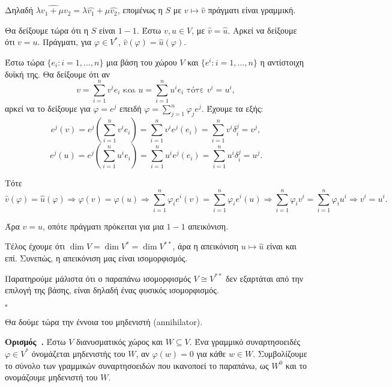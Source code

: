\documentclass[12pt, a4paper]{book}
\newcounter{definition}[section]
\newenvironment{definition}[1][]{\refstepcounter{definition}\par\medskip
   \textbf{Ορισμός~\thedefinition. #1} \rmfamily}{\medskip}
\begin{document}
Δηλαδή $\widehat{λv_1+μv_2} = λ\widehat{v_1} + μ\widehat{v_2}$, επομένως η $S$ με $v \mapsto \widehat{v}$ πράγματι είναι γραμμική.

Θα δείξουμε τώρα ότι η $S$ είναι $1-1$. Έστω $v, u \in V$, με $\widehat{v} = \widehat{u}$. Aρκεί να δείξουμε ότι $v = u$. Πράγματι, για $φ \in V^*$, $\widehat{v}(φ) = \widehat{u}(φ)$. 

Έστω τώρα $\{e_i: i=1,…,n\}$ μια βάση του χώρου $V$ και $\{e^i:i=1,…,n \}$ η αντίστοιχη δυϊκή της. Θα δείξουμε ότι αν
\begin{displaymath}
v = \sum_{i=1}^nv^ie_i \text{ και } u=\sum_{i=1}^nu^ie_i \text{ τότε } v^i = u^i,
\end{displaymath}
αρκεί να το δείξουμε για $φ = e^j$ επειδή $φ = \sum_{j=1}^nφ_ je^j$. Έχουμε τα εξής:
\begin{displaymath}
e^j(v) = e^j(\sum_{i=1}^nv^ie_i)= \sum_{i=1}^nv^ie^j(e_i)= \sum_{i=1}^nv^iδ_i^j = v^j,
\end{displaymath}
\begin{displaymath}
e^j(u) = e^j(\sum_{i=1}^nu^ie_i)= \sum_{i=1}^nu^ie^j(e_i)= \sum_{i=1}^nu^iδ_i^j = u^j.
\end{displaymath}

Τότε
\begin{displaymath}
\widehat{v}(φ) = \widehat{u}(φ) \Rightarrow φ(v) = φ(u) \Rightarrow \sum_{i=1}^nφ_ ie^i(v) = \sum_{i=1}^nφ_ ie^i(u) \Rightarrow \sum_{i=1}^nφ_ iv^i =\sum_{i=1}^nφ_ iu^i \Rightarrow v^i = u^i.
\end{displaymath}

Άρα $v = u$, οπότε πράγματι πρόκειται για μια $1-1$ απεικόνιση.

Τέλος έχουμε ότι $\dim{V} = \dim{V^*} = \dim{V^{**}}$, άρα η απεικόνιση $u \mapsto \widehat{u}$ είναι και επί. Συνεπώς, η απεικόνιση μας είναι ισομορφισμός.

Παρατηρούμε μάλιστα ότι ο παραπάνω ισομορφισμός $V \cong V^{**}$ δεν εξαρτάται από την επιλογή της βάσης, είναι δηλαδή ένας φυσικός ισομορφισμός.
  \begin{flushright}
  $\square$
  \end{flushright}
  
Θα δούμε τώρα την έννοια του μηδενιστή \textlatin{(annihilator)}.

\begin{definition}
Έστω $V$ διανυσματικός χώρος και  $W \subseteq V$. Ένα γραμμικό συναρτησοειδές $φ \in V^*$ όνομάζεται μηδενιστής του $W$, αν $φ(w)=0$ για κάθε $w \in W$. Συμβολίζουμε το σύνολο των γραμμικών συναρτησοειδών που ικανοποεί το παραπάνω, ως $W^0$ και το ονομάζουμε μηδενιστή του $W$.
\end{definition}
\end{document}
